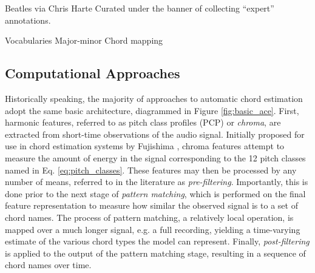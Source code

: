 Beatles via Chris Harte
Curated under the banner of collecting ``expert'' annotations.

Vocabularies
Major-minor Chord mapping



\subsection{Computational Approaches}
\label{subsec:computational_approaches}

Historically speaking, the majority of approaches to automatic chord estimation adopt the same basic architecture, diagrammed in Figure \ref{fig:basic_ace}.
First, harmonic features, referred to as pitch class profiles (PCP) or \emph{chroma}, are extracted from short-time observations of the audio signal.
Initially proposed for use in chord estimation systems by Fujishima \cite{fujishima1999}, chroma features attempt to measure the amount of energy in the signal corresponding to the 12 pitch classes named in Eq. \ref{eq:pitch_classes}.
These features may then be processed by any number of means, referred to in the literature as \emph{pre-filtering}.
Importantly, this is done prior to the next stage of \emph{pattern matching}, which is performed on the final feature representation to measure how similar the observed signal is to a set of chord names.
The process of pattern matching, a relatively local operation, is mapped over a much longer signal, e.g. a full recording, yielding a time-varying estimate of the various chord types the model can represent.
Finally, \emph{post-filtering} is applied to the output of the pattern matching stage, resulting in a sequence of chord names over time.

